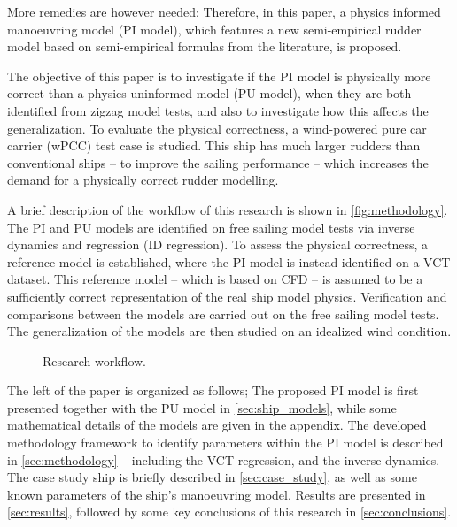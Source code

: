 More remedies are however needed; Therefore, in this paper, a physics informed manoeuvring model (PI model), which features a new semi-empirical rudder model based on semi-empirical formulas from the literature, is proposed.

The objective of this paper is to investigate if the PI model is physically more correct than a physics uninformed model (PU model), when they are both identified from zigzag model tests, and also to investigate how this affects the generalization.
To evaluate the physical correctness, a wind-powered pure car carrier (wPCC) test case is studied. 
This ship has much larger rudders than conventional ships -- to improve the sailing performance -- 
which increases the demand for a physically correct rudder modelling.

A brief description of the workflow of this research is shown in \autoref{fig:methodology}.
The PI and PU models are identified on free sailing model tests \citep{alexandersson_wpcc_2024} via inverse dynamics \citep{faber_inverse_2018} and regression (ID regression). To assess the physical correctness, a reference model is established, where the PI model is instead identified on a VCT dataset. This reference model -- which is based on CFD -- is assumed to be a sufficiently correct representation of the real ship model physics.
Verification and comparisons between the models are carried out on the free sailing model tests. The generalization of the models are then studied on an idealized wind condition.
%
\begin{figure}[h]
  \centering
  
  \caption{Research workflow.}
  \label{fig:methodology}
\end{figure}

The left of the paper is organized as follows; The proposed PI model is first presented together with the PU 
 model in \autoref{sec:ship_models}, while some mathematical details of the models are given in the appendix. 
The developed methodology framework to identify parameters within the PI model is described in \autoref{sec:methodology} -- including the VCT regression, and the inverse dynamics. The case study ship is briefly described in \autoref{sec:case_study}, as well as some known parameters of the ship's manoeuvring model. Results are presented in \autoref{sec:results}, followed by some key conclusions of this research in \autoref{sec:conclusions}.